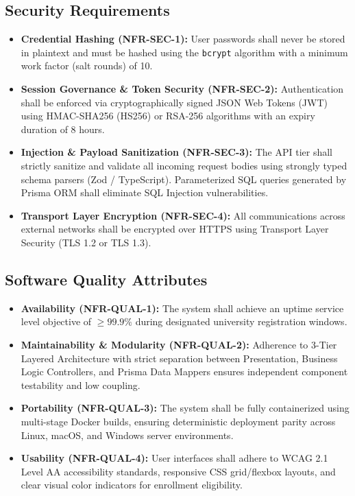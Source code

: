 \documentclass[a4paper,12pt]{article}
\begin{document}
\subsection{Security Requirements}
\begin{itemize}[leftmargin=1.2cm]
    \item \textbf{Credential Hashing (NFR-SEC-1):} User passwords shall never be stored in plaintext and must be hashed using the \texttt{bcrypt} algorithm with a minimum work factor (salt rounds) of 10.
    \item \textbf{Session Governance \& Token Security (NFR-SEC-2):} Authentication shall be enforced via cryptographically signed JSON Web Tokens (JWT) using HMAC-SHA256 (HS256) or RSA-256 algorithms with an expiry duration of 8 hours.
    \item \textbf{Injection \& Payload Sanitization (NFR-SEC-3):} The API tier shall strictly sanitize and validate all incoming request bodies using strongly typed schema parsers (Zod / TypeScript). Parameterized SQL queries generated by Prisma ORM shall eliminate SQL Injection vulnerabilities.
    \item \textbf{Transport Layer Encryption (NFR-SEC-4):} All communications across external networks shall be encrypted over HTTPS using Transport Layer Security (TLS 1.2 or TLS 1.3).
\end{itemize}

\subsection{Software Quality Attributes}
\begin{itemize}[leftmargin=1.2cm]
    \item \textbf{Availability (NFR-QUAL-1):} The system shall achieve an uptime service level objective of $\ge 99.9\%$ during designated university registration windows.
    \item \textbf{Maintainability \& Modularity (NFR-QUAL-2):} Adherence to 3-Tier Layered Architecture with strict separation between Presentation, Business Logic Controllers, and Prisma Data Mappers ensures independent component testability and low coupling.
    \item \textbf{Portability (NFR-QUAL-3):} The system shall be fully containerized using multi-stage Docker builds, ensuring deterministic deployment parity across Linux, macOS, and Windows server environments.
    \item \textbf{Usability (NFR-QUAL-4):} User interfaces shall adhere to WCAG 2.1 Level AA accessibility standards, responsive CSS grid/flexbox layouts, and clear visual color indicators for enrollment eligibility.
\end{itemize}
\end{document}
